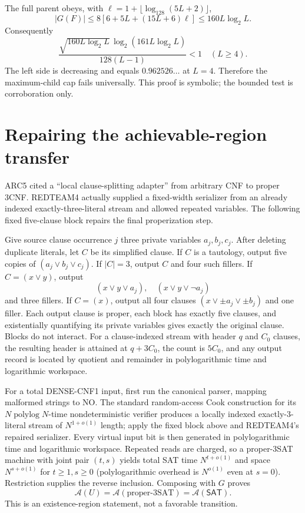 \documentclass[11pt]{article}
\newcommand{\SAT}{\mathsf{SAT}}
\begin{document}
The full parent obeys, with
$\ell=1+\lfloor\log_{128}(5L+2)\rfloor$,
\[
 |G(F)|\le8[6+5L+(15L+6)\ell]\le160L\log_2L.
\]
Consequently
\[
 \frac{\sqrt{160L\log_2L}\,
  \log_2(161L\log_2L)}{128(L-1)}<1\quad(L\ge4).
\]
The left side is decreasing and equals $0.962526\ldots$ at $L=4$.
Therefore the maximum-child cap fails universally.  This proof is symbolic;
the bounded test is corroboration only.

\section{Repairing the achievable-region transfer}
ARC5 cited a ``local clause-splitting adapter'' from arbitrary CNF to proper
3CNF.  REDTEAM4 actually supplied a fixed-width serializer from an already
indexed exactly-three-literal stream and allowed repeated variables.  The
following fixed five-clause block repairs the final properization step.

Give source clause occurrence $j$ three private variables $a_j,b_j,c_j$.
After deleting duplicate literals, let $C$ be its simplified clause.
If $C$ is a tautology, output five copies of $(a_j\vee b_j\vee c_j)$.
If $|C|=3$, output $C$ and four such fillers.  If
$C=(x\vee y)$, output
\[
 (x\vee y\vee a_j),\quad(x\vee y\vee\neg a_j)
\]
and three fillers.  If $C=(x)$, output all four clauses
$(x\vee \pm a_j\vee\pm b_j)$ and one filler.  Each output clause is proper,
each block has exactly five clauses, and existentially quantifying its private
variables gives exactly the original clause.  Blocks do not interact.
For a clause-indexed stream with header $q$ and $C_0$ clauses, the resulting
header is attained at $q+3C_0$, the count is $5C_0$, and any output record is
located by quotient and remainder in polylogarithmic time and logarithmic
workspace.

For a total DENSE-CNF1 input, first run the canonical parser, mapping malformed
strings to NO.  The standard random-access Cook construction for its
$N\operatorname{polylog}N$-time nondeterministic verifier produces a locally
indexed exactly-3-literal stream of $N^{1+o(1)}$ length; apply the fixed block
above and REDTEAM4's repaired serializer.  Every virtual input bit is then
generated in polylogarithmic time and logarithmic workspace.  Repeated reads
are charged, so a proper-3SAT machine with joint pair $(t,s)$ yields total SAT
time $N^{t+o(1)}$ and space $N^{s+o(1)}$ for $t\ge1,s\ge0$ (polylogarithmic
overhead is $N^{o(1)}$ even at $s=0$).  Restriction supplies the reverse
inclusion.  Composing with $G$ proves
\[
 \boxed{\mathcal A(U)=\mathcal A(\text{proper-3SAT})=
        \mathcal A(\SAT)}.
\]
This is an existence-region statement, not a favorable transition.
\end{document}
